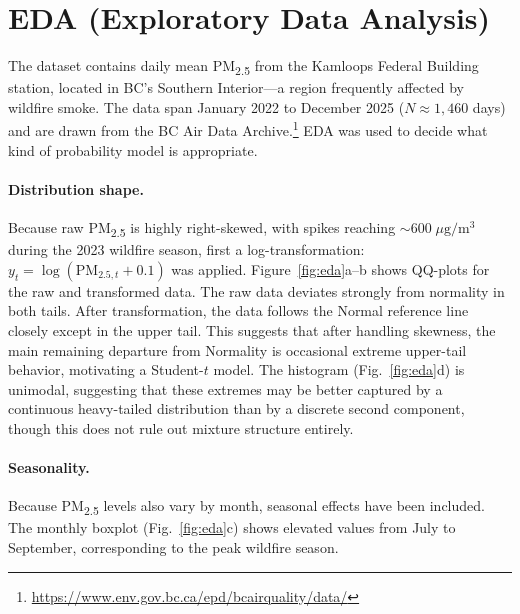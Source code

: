 \documentclass[10pt]{article}
\begin{document}
\section{EDA (Exploratory Data Analysis)}

The dataset contains daily mean PM\textsubscript{2.5} from the Kamloops Federal Building station, located in BC's Southern Interior---a region frequently affected by wildfire smoke. The data span January 2022 to December 2025 ($N \approx 1{,}460$ days) and are drawn from the BC Air Data Archive.\footnote{\url{https://www.env.gov.bc.ca/epd/bcairquality/data/}} EDA was used to decide what kind of probability model is appropriate.

\paragraph{Distribution shape.} Because raw PM\textsubscript{2.5} is highly right-skewed, with spikes reaching $\sim 600\;\mu\mathrm{g}/\mathrm{m}^{3}$ during the 2023 wildfire season, first a log-transformation: $y_{t}=\log\left(\mathrm{PM}_{2.5, t}+0.1\right)$ was applied. Figure~\ref{fig:eda}a--b shows QQ-plots for the raw and transformed data. The raw data deviates strongly from normality in both tails. After transformation, the data follows the Normal reference line closely except in the upper tail. This suggests that after handling skewness, the main remaining departure from Normality is occasional extreme upper-tail behavior, motivating a Student-$t$ model. The histogram (Fig.~\ref{fig:eda}d) is unimodal, suggesting that these extremes may be better captured by a continuous heavy-tailed distribution than by a discrete second component, though this does not rule out mixture structure entirely.

\paragraph{Seasonality.} Because PM\textsubscript{2.5} levels also vary by month, seasonal effects have been included. The monthly boxplot (Fig.~\ref{fig:eda}c) shows elevated values from July to September, corresponding to the peak wildfire season.
\end{document}
